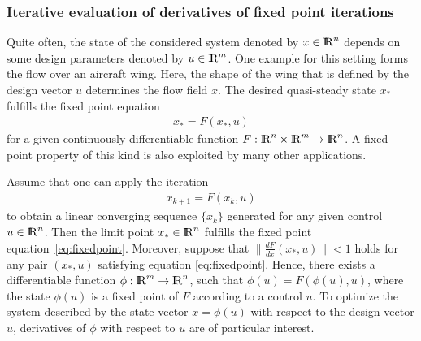 \documentclass[11pt,twoside]{article}
\newcommand{\R}{{ {\rm I} \kern -.225em {\rm R} }}
\begin{document}
\subsubsection{Iterative evaluation of derivatives of fixed point iterations}
Quite often, the state of the considered system denoted by $x\in\R^n$
depends on some design parameters denoted by $u\in\R^m$. One example for this setting
forms the flow over an aircraft wing. Here, the shape of the wing that
is defined by the design vector $u$  
determines the flow field $x$. The desired quasi-steady state $x_*$
fulfills the fixed point equation
\begin{align}
  \label{eq:fixedpoint}
  x_* = F(x_*,u)
\end{align}
for a given continuously differentiable function 
$F:\R^n\times\R^m\rightarrow\R^n$. A fixed point property of this kind is
also exploited by many other applications.

Assume that one can apply the iteration  
\begin{align}
\label{eq:iteration}
 x_{k+1} = F(x_k,u)
\end{align}
to obtain a linear converging sequence $\{x_k\}$ generated
for any given control $u\in\R^n$. Then the limit point $x_*\in\R^n$ fulfills the fixed
point equation~\eqref{eq:fixedpoint}. Moreover,
suppose that $\|\frac{dF}{dx}(x_*,u)\|<1$ holds for any pair
$(x_*,u)$ satisfying equation \eqref{eq:fixedpoint}.
Hence, there exists a
differentiable function $\phi:\R^m \rightarrow \R^n$,
such that $\phi(u) = F(\phi(u),u)$, where the state 
$\phi(u)$ is a fixed point of $F$ according to a control
$u$. To optimize the system described by the state vector $x=\phi(u)$ with respect to
the design vector $u$, derivatives of $\phi$ with respect
to $u$ are of particular interest.
 
%
\end{document}

